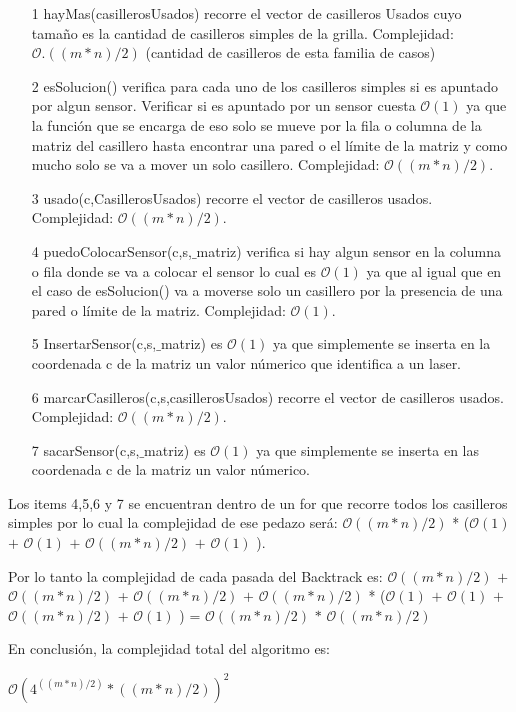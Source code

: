 \begin{itemize}
	\item[1] hayMas(casillerosUsados) recorre el vector de casilleros Usados cuyo tamaño es la cantidad de casilleros simples de la grilla. Complejidad: $\mathcal{O}.((m*n)/2)$ (cantidad de casilleros de esta familia de casos)
	\item[2] esSolucion() verifica para cada uno de los casilleros simples si es apuntado por algun sensor. Verificar si es apuntado por un sensor cuesta $\mathcal{O}(1)$ ya que la función que se encarga de eso solo se mueve por la fila o columna de la matriz del casillero hasta encontrar una pared o el límite de la matriz y como mucho solo se va a mover un solo casillero. Complejidad: $\mathcal{O}((m*n)/2)$.
	\item[3] usado(c,CasillerosUsados) recorre el vector de casilleros usados. Complejidad: $\mathcal{O}((m*n)/2)$.
	\item[4] puedoColocarSensor(c,s,$\_$matriz) verifica si hay algun sensor en la columna o fila donde se va a colocar el sensor lo cual es $\mathcal{O}(1)$ ya que al igual que en el caso de esSolucion() va a moverse solo un casillero por la presencia de una pared o límite de la matriz. Complejidad: $\mathcal{O}(1)$.
	\item[5] InsertarSensor(c,s,$\_$matriz) es $\mathcal{O}(1)$ ya que simplemente se inserta en la coordenada c de la matriz un valor númerico que identifica a un laser.
	\item[6] marcarCasilleros(c,s,casillerosUsados) recorre el vector de casilleros usados. Complejidad: $\mathcal{O}((m*n)/2)$.
	\item[7] sacarSensor(c,s,$\_$matriz) es $\mathcal{O}(1)$ ya que simplemente se inserta en las coordenada c de la matriz un valor númerico.
\end{itemize}

Los items 4,5,6 y 7 se encuentran dentro de un for que recorre todos los casilleros simples por lo cual la complejidad de ese pedazo será: $\mathcal{O}((m*n)/2)$ * ($\mathcal{O}(1)$ $+$ $\mathcal{O}(1)$ $+$ $\mathcal{O}((m*n)/2)$ $+$ $\mathcal{O}(1)$ ).

Por lo tanto la complejidad de cada pasada del Backtrack es:
$\mathcal{O}((m*n)/2)$ $+$ $\mathcal{O}((m*n)/2)$ + $\mathcal{O}((m*n)/2)$ $+$ $\mathcal{O}((m*n)/2)$ * ($\mathcal{O}(1)$ $+$ $\mathcal{O}(1)$ $+$ $\mathcal{O}((m*n)/2)$ $+$ $\mathcal{O}(1)$ ) = $\mathcal{O}((m*n)/2)$ $*$ $\mathcal{O}((m*n)/2)$

En conclusión, la complejidad total del algoritmo es:

$\mathcal{O}(4^{((m*n)/2)}*((m*n)/2))^2$
